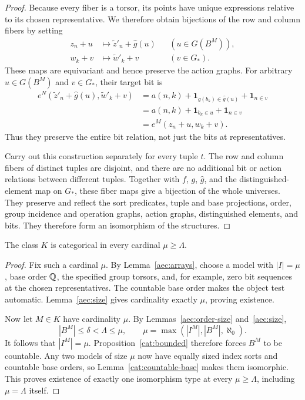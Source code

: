 \begin{proof}
Because every fiber is a torsor, its points have unique expressions
relative to its chosen representative. We therefore obtain
bijections of the row and column fibers by setting
\begin{equation}\label{cat:equivariant-maps}
 \begin{aligned}
 z_n+u&\longmapsto\widetilde z'_n+\widehat g(u)
                  &&(u\in G(B^M)),\\
 w_k+v&\longmapsto\widetilde w'_k+v
                  &&(v\in G_*).
 \end{aligned}
\end{equation}
These maps are equivariant and hence preserve the action graphs.
For arbitrary $u\in G(B^M)$ and $v\in G_*$, their target bit is
\[
 \begin{split}
 e^N(\widetilde z'_n+\widehat g(u),\widetilde w'_k+v)
 &=a(n,k)+\boldsymbol 1_{g(b_k)\in\widehat g(u)}
                +\boldsymbol 1_{n\in v}\\
 &=a(n,k)+\boldsymbol 1_{b_k\in u}+\boldsymbol 1_{n\in v}\\
 &=e^M(z_n+u,w_k+v).
 \end{split}
\]
Thus they preserve the entire bit relation, not just the bits at
representatives.

Carry out this construction separately for every tuple $t$. The row
and column fibers of distinct tuples are disjoint, and there are no
additional bit or action relations between different tuples. Together
with $f$, $g$, $\widehat g$, and the distinguished-element map on
$G_*$, these fiber maps give a bijection of the whole universes.
They preserve and reflect the sort predicates, tuple and base
projections, order, group incidence and operation graphs, action
graphs, distinguished elements, and bits. They therefore form an
isomorphism of the structures.
\end{proof}

\begin{theorem}\label{cat:tail}
The class $K$ is categorical in every cardinal $\mu\ge\Lambda$.
\end{theorem}

\begin{proof}
Fix such a cardinal $\mu$. By Lemma~\ref{aec:arrays}, choose a model
with $|I|=\mu$, base order $\mathbb Q$, the specified group torsors, and,
for example, zero bit sequences at the chosen representatives.
The countable base order makes the object test automatic.
Lemma~\ref{aec:size} gives cardinality exactly $\mu$, proving
existence.

Now let $M\in K$ have cardinality $\mu$. By
Lemmas~\ref{aec:order-size} and~\ref{aec:size},
\[
 |B^M|\le\delta<\Lambda\le\mu,
 \qquad
 \mu=\max(|I^M|,|B^M|,\aleph_0).
\]
It follows that $|I^M|=\mu$. Proposition~\ref{cat:bounded} therefore
forces $B^M$ to be countable. Any two models of size $\mu$ now have
equally sized index sorts and countable base orders, so
Lemma~\ref{cat:countable-base} makes them isomorphic. This proves
existence of exactly one isomorphism type at every $\mu\ge\Lambda$,
including $\mu=\Lambda$ itself.
\end{proof}
